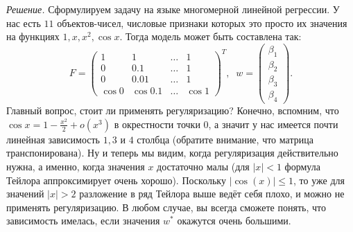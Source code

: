 \noindent\textit{Решение.} Сформулируем задачу на языке многомерной линейной регрессии. У нас есть $11$ объектов-чисел, числовые признаки которых это просто их значения на функциях $1, x, x^2, \cos x$. Тогда модель может быть составлена так:
$$F = \begin{pmatrix}
    1      & 1        & \dots & 1       \\
    0      & 0.1      & \dots & 1       \\
    0      & 0.01     & \dots & 1       \\
    \cos 0 & \cos 0.1 & \dots & \cos 1
  \end{pmatrix}^T, \;\; w = \begin{pmatrix}
    \beta_1 \\
    \beta_2 \\
    \beta_3 \\
    \beta_4
  \end{pmatrix}.$$
Главный вопрос, стоит ли применять регуляризацию? Конечно, вспомним, что $\cos x = 1 - \frac{x^2}{2} + o(x^3)$ в окрестности точки $0$, а значит у нас имеется почти линейная зависимость $1, 3$ и $4$ столбца (обратите внимание, что матрица транспонирована). Ну и теперь мы видим, когда регуляризация действительно нужна, а именно, когда значения $x$ достаточно малы (для $|x| < 1$ формула Тейлора аппроксимирует очень хорошо). Поскольку $|\cos(x)| \leqslant 1$, то уже для значений $|x| > 2$ разложение в ряд Тейлора выше ведёт себя плохо, и можно не применять регуляризацию. В любом случае, вы всегда сможете понять, что зависимость имелась, если значения $w^*$ окажутся очень большими.

